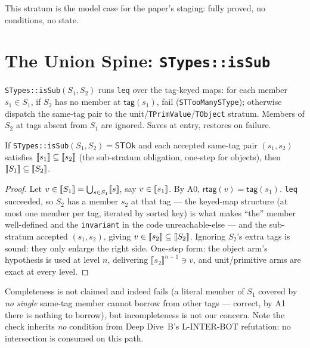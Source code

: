 \documentclass[11pt]{article}
\newcommand{\tagfn}{\mathsf{tag}}
\newcommand{\rtag}{\mathsf{rtag}}
\newcommand{\STypes}{\mathsf{STypes}}
\newcommand{\STOk}{\mathsf{STOk}}
\newcommand{\semn}[2]{\llbracket #1 \rrbracket^{#2}}
\begin{document}
This stratum is the model case for the paper's staging: fully proved,
no conditions, no state.

\section{The Union Spine: \texttt{STypes::isSub}}
\label{sec:stypes}

\begin{definition}
\texttt{STypes::isSub}$(S_1, S_2)$ runs \texttt{leq} over the tag-keyed
maps: for each member $s_1 \in S_1$, if $S_2$ has no member at
$\tagfn(s_1)$, fail (\texttt{STTooManySType}); otherwise dispatch the
same-tag pair to the unit/\texttt{TPrimValue}/\texttt{TObject} stratum.
Members of $S_2$ at tags absent from $S_1$ are ignored. Saves at entry,
restores on failure.
\end{definition}

\begin{lemma}[$\STypes$ Covering is Sound]
\label{lem:stypes}
If \texttt{STypes::isSub}$(S_1,S_2) = \STOk$ and each accepted same-tag
pair $(s_1, s_2)$ satisfies $\llbracket s_1 \rrbracket \subseteq \llbracket s_2 \rrbracket$ (the
sub-stratum obligation, one-step for objects), then
$\llbracket S_1 \rrbracket \subseteq \llbracket S_2 \rrbracket$.
\end{lemma}
\begin{proof}
Let $v \in \llbracket S_1 \rrbracket = \bigcup_{s \in S_1}\llbracket s \rrbracket$, say $v \in \llbracket s_1 \rrbracket$.
By A0, $\rtag(v) = \tagfn(s_1)$. \texttt{leq} succeeded, so $S_2$ has a
member $s_2$ at that tag --- the keyed-map structure (at most one member
per tag, iterated by sorted key) is what makes ``the'' member
well-defined and the \texttt{invariant} in the code unreachable-else ---
and the sub-stratum accepted $(s_1, s_2)$, giving
$v \in \llbracket s_2 \rrbracket \subseteq \llbracket S_2 \rrbracket$. Ignoring $S_2$'s extra tags is
sound: they only enlarge the right side. One-step form: the object arm's
hypothesis is used at level $n$, delivering $\semn{s_2}{n+1} \ni v$,
and unit/primitive arms are exact at every level.
\end{proof}

Completeness is not claimed and indeed fails (a literal member of $S_1$
covered by \emph{no single} same-tag member cannot borrow from other
tags --- correct, by A1 there is nothing to borrow), but incompleteness
is not our concern. Note the check inherits \emph{no} condition from
Deep Dive~B's L-INTER-BOT refutation: no intersection is consumed on this
path.
\end{document}
